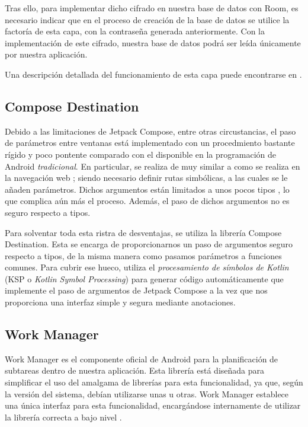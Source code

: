             Tras ello, para implementar dicho cifrado en nuestra base de datos con Room, es necesario indicar que en el 
            proceso de creación de la base de datos se utilice la factoría de esta capa, con la contraseña generada 
            anteriormente. Con la implementación de este cifrado, nuestra base de datos podrá ser leída 
            únicamente por nuestra aplicación.
            
            Una descripción detallada del funcionamiento de esta capa puede encontrarse en \cite{ferry_protect_2020}.

        \subsection{Compose Destination}

            Debido a las limitaciones de Jetpack Compose, entre otras circustancias, el paso de parámetros entre 
            ventanas está implementado con un procedmiento bastante rígido y poco pontente comparado con el disponible
            en la programación de Android \textit{tradicional}. En particular, se realiza de  muy similar a como 
            se realiza en la navegación web  \cite{noauthor_navigating_nodate}; siendo 
            necesario definir rutas simbólicas, a las cuales se le añaden parámetros. Dichos argumentos están limitados
            a unos pocos tipos \cite{noauthor_pass_nodate}, lo que complica aún más el proceso. Además, el paso de
            dichos argumentos no es seguro respecto a tipos.

            Para solventar toda esta ristra de desventajas, se utiliza la librería Compose Destination. Esta se encarga
            de proporcionarnos un paso de argumentos seguro respecto a tipos, de la misma manera como pasamos parámetros
            a funciones comunes. Para cubrir ese hueco, utiliza el \textit{procesamiento de símbolos de Kotlin} (KSP o 
            \textit{Kotlin Symbol Processing}) para generar código automáticamente que implemente el paso de argumentos
            de Jetpack Compose a la vez que nos proporciona una interfaz simple y segura mediante anotaciones.

        \subsection{Work Manager}
            Work Manager es el componente oficial de Android para la planificación de subtareas dentro de nuestra 
            aplicación. Esta librería está diseñada para simplificar el uso del amalgama de librerías para esta
            funcionalidad, ya que, según la versión del sistema, debían utilizarse unas u otras. Work Manager establece
            una única interfaz para esta funcionalidad, encargándose internamente de utilizar la librería correcta a
            bajo nivel \cite{noauthor_workmanager_nodate}.
            
